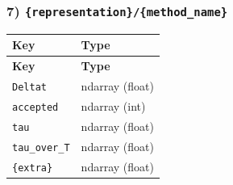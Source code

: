 \documentclass[11pt]{article}
\begin{document}
\subsubsection*{7) \texttt{\{representation\}/\allowbreak{}\{method\_\allowbreak{}name\}}}
\begin{longtable}{|p{}|p{}|}
\hline
\textbf{Key} & \textbf{Type} \\ \hline
\endfirsthead
\hline
\textbf{Key} & \textbf{Type} \\ \hline
\endhead
\texttt{Deltat} & ndarray (float) \\ \hline
\texttt{accepted} & ndarray (int) \\ \hline
\texttt{tau} & ndarray (float) \\ \hline
\texttt{tau\_\allowbreak{}over\_\allowbreak{}T} & ndarray (float) \\ \hline
\texttt{\{extra\}} & ndarray (float) \\ \hline
\end{longtable}
\end{document}
